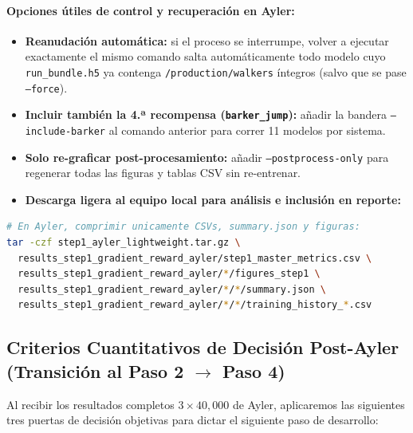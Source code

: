 \documentclass[10pt,a4paper]{article}
\begin{document}
\paragraph{Opciones útiles de control y recuperación en Ayler:}
\begin{itemize}
\item \textbf{Reanudación automática:} si el proceso se interrumpe, volver a ejecutar exactamente el mismo comando salta automáticamente todo modelo cuyo \texttt{run\_bundle.h5} ya contenga \texttt{/production/walkers} íntegros (salvo que se pase \texttt{--force}).
\item \textbf{Incluir también la 4.ª recompensa (\texttt{barker\_jump}):} añadir la bandera \texttt{--include-barker} al comando anterior para correr 11 modelos por sistema.
\item \textbf{Solo re-graficar post-procesamiento:} añadir \texttt{--postprocess-only} para regenerar todas las figuras y tablas CSV sin re-entrenar.
\item \textbf{Descarga ligera al equipo local para análisis e inclusión en reporte:}
\end{itemize}

\begin{lstlisting}[language=bash, float=htbp, caption={Empaquetado ligero de resultados y figuras de Ayler (sin copiar archivos .h5 pesados).}]
# En Ayler, comprimir unicamente CSVs, summary.json y figuras:
tar -czf step1_ayler_lightweight.tar.gz \
  results_step1_gradient_reward_ayler/step1_master_metrics.csv \
  results_step1_gradient_reward_ayler/*/figures_step1 \
  results_step1_gradient_reward_ayler/*/*/summary.json \
  results_step1_gradient_reward_ayler/*/*/training_history_*.csv
\end{lstlisting}

\subsection{Criterios Cuantitativos de Decisión Post-Ayler (Transición al Paso 2 \texorpdfstring{$\to$}{->} Paso 4)}

Al recibir los resultados completos $3\times 40{,}000$ de Ayler, aplicaremos las siguientes tres puertas de decisión objetivas para dictar el siguiente paso de desarrollo:
\end{document}
